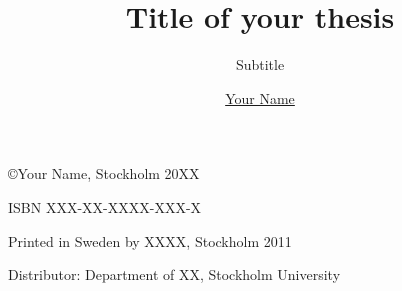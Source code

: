 \documentclass[twoside,11pt]{Latex/Classes/PhDthesisSU} %
\title{Title of your thesis}%
\subtitle{Subtitle}%
\author{\href{mailto:email@department.su.se}{Your Name}}
\begin{document}

\frontmatterSU

\halftitlepage


\maketitle  %



\newpage
\thispagestyle{empty}


\phantom{.}


{\selectfont
{\scriptsize
\noindent
\copyright Your Name, Stockholm 20XX %
 
\vspace{5mm}
\noindent
ISBN XXX-XX-XXXX-XXX-X %

\vspace{5mm}
\noindent
Printed in Sweden by XXXX, Stockholm 2011 %

\noindent
Distributor: Department of XX, Stockholm University %
}
}
\cleardoublepage








\setcounter{secnumdepth}{2} %
\setcounter{tocdepth}{2}    %
\tableofcontents            %



\end{document}
